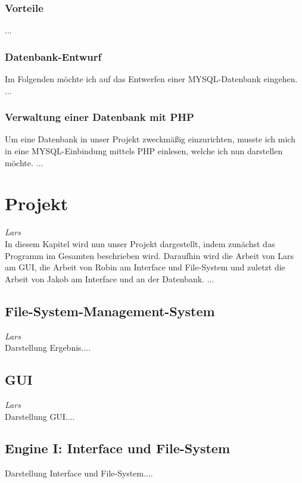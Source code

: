 \documentclass[12pt,a4paper,bibliography=totocnumbered,listof=totocnumbered]{scrartcl}
\begin{document}
\subsubsection{Vorteile}
...

\subsubsection{Datenbank-Entwurf}
Im Folgenden möchte ich auf das Entwerfen einer MYSQL-Datenbank eingehen.
...

\subsubsection{Verwaltung einer Datenbank mit PHP}
Um eine Datenbank in unser Projekt zweckmäßig einzurichten, musste ich mich in eine MYSQL-Einbindung mittels PHP einlesen, welche ich nun darstellen möchte.
...

\pagebreak

\section{Projekt}
\emph{Lars}\\
In diesem Kapitel wird nun unser Projekt dargestellt, indem zunächst das Programm im Gesamten beschrieben wird. Daraufhin wird die Arbeit von Lars am GUI, die Arbeit von Robin am Interface und File-System und zuletzt die Arbeit von Jakob am Interface und an der Datenbank.
...

\subsection{File-System-Management-System}
\emph{Lars}\\
Darstellung Ergebnis....

\subsection{GUI}
\emph{Lars}\\
Darstellung GUI....

\subsection{Engine I: Interface und File-System}
Darstellung Interface und File-System....
\end{document}
